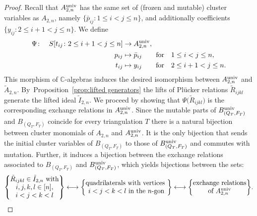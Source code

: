 \documentclass[pdftex]{sigma}%
\numberwithin{equation}{section}
\begin{document}
\begin{proof}
Recall that $A_{2,n}^{\rm univ}$ has the same set of (frozen and mutable) cluster variables as $A_{2,n}$, namely $\{\bar p_{ij}\colon 1\le i<j\le n\}$, and additionally coefficients $\{y_{ij}\colon 2\le i+1<j\le n\}$.
We define
\begin{displaymath}\begin{split}
\Psi\colon\quad S[t_{ij}\colon 2\le i+1<j\le n] &\to A_{2,n}^{\rm univ},\\
 p_{ij} &\mapsto \bar p_{ij} \qquad \text{for}\quad 1\le i<j\le n, \\
t_{ij} &\mapsto y_{ij}\qquad \text{for}\quad 2\le i+1<j\le n.
\end{split}
\end{displaymath}
This morphism of $\mathbb C$-algebras induces the desired isomorphism between $A_{2,n}^{\rm univ}$ and $\tilde A_{2,n}$.
By~Pro\-po\-si\-tion~\ref{prop:lifted generators} the lifts of Pl\"ucker relations $\tilde R_{ijkl}$ generate the lifted ideal $\tilde I_{2,n}$.
We proceed by showing that $\Psi\big(\tilde R_{ijkl}\big)$ is the corresponding exchange relations in $A^{\rm univ}_{2,n}$.
Since the mutable parts of $B^{\rm univ}_{(Q_T,F_T)}$ and $B_{(Q_T,F_T)}$ coincide for every triangulation $T$ there is a natural bijection between cluster monomials of $A_{2,n}$ and $A_{2,n}^{\rm univ}$.
It is the only bijection that sends the initial cluster variables of $B_{(Q_T,F_T)}$ to those of $B^{\rm univ}_{(Q_T,F_T)}$ and commutes with mutation.
Further, it induces a bijection between the exchange relations associated to $B_{(Q_T,F_T)}$ and $B^{\rm univ}_{(Q_T,F_T)}$, which yields bijections between the sets:
\begin{displaymath}
 \left\{\begin{matrix}
 \tilde R_{ijkl}\in \tilde I_{2,n} \text{ with} \\
 i,j,k,l\in [n],\\
 i<j<k<l
 \end{matrix}\right\}
\longleftrightarrow
 \left\{\begin{matrix}
 \text{quadrilaterals with vertices } \\
 i<j<k<l \text{ in the $n$-gon}
 \end{matrix}\right\}
\longleftrightarrow
 \left\{\begin{matrix}
 \text{exchange relations}\\
 \text{of } A_{2,n}^{\rm univ}
 \end{matrix}\right\}\!.
\end{displaymath}

\end{proof}
\end{document}
